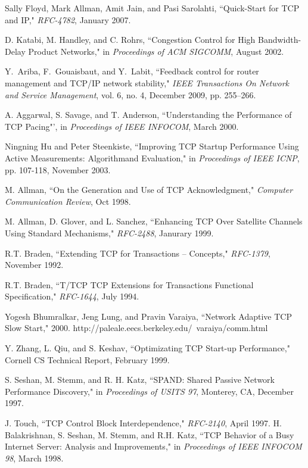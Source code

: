 \documentclass[12pt,onecolumn]{IEEEtran}
\begin{document}
\begin{thebibliography}{99}
Sally Floyd, Mark Allman, Amit Jain, and Pasi Sarolahti, ``Quick-Start for TCP and IP," \emph{RFC-4782}, January 2007.


D. Katabi, M. Handley, and C. Rohrs, ``Congestion Control for High Bandwidth-Delay Product Networks," in \emph{Proceedings of ACM SIGCOMM}, August 2002.


Y.~Ariba, F.~Gouaisbaut, and Y.~Labit, ``Feedback control for router management
and TCP/IP network stability,"  \emph{IEEE Transactions On Network and Service
Management}, vol. 6, no. 4, December 2009, pp. 255--266.


A. Aggarwal, S. Savage, and T. Anderson, ``Understanding the Performance of TCP Pacing"', in \emph{Proceedings of IEEE INFOCOM}, March 2000.


Ningning Hu and Peter Steenkiste, ``Improving TCP Startup Performance Using Active Measurements: Algorithmand Evaluation," in \emph{Proceedings of IEEE ICNP}, pp. 107-118, November 2003.


M. Allman, ``On the Generation and Use of TCP Acknowledgment," \emph{Computer Communication Review}, Oct 1998.

M. Allman, D. Glover, and L. Sanchez, ``Enhancing TCP Over Satellite Channels Using Standard Mechanisms," \emph{RFC-2488}, Janurary 1999.


R.T. Braden, ``Extending TCP for Transactions -- Concepts," \emph{RFC-1379}, November 1992.

R.T. Braden, ``T/TCP TCP Extensions for Transactions Functional Specification," \emph{RFC-1644}, July 1994.

Yogesh Bhumralkar, Jeng Lung, and Pravin Varaiya, ``Network Adaptive TCP Slow Start," 2000. http://paleale.eecs.berkeley.edu/~varaiya/comm.html

Y. Zhang, L. Qiu, and S. Keshav, ``Optimizating TCP Start-up Performance," Cornell CS Technical Report, February 1999.


S. Seshan, M. Stemm, and R. H. Katz, ``SPAND: Shared Passive Network Performance Discovery," in \emph{Proceedings of USITS 97}, Monterey, CA, December 1997.

J. Touch, ``TCP Control Block Interdependence," \emph{RFC-2140}, April 1997.
H. Balakrishnan, S. Seshan, M. Stemm, and R.H. Katz, ``TCP Behavior of a Busy Internet Server: Analysis and Improvements," in \emph{Proceedings of IEEE INFOCOM 98}, March 1998.


\end{thebibliography}
\end{document}

